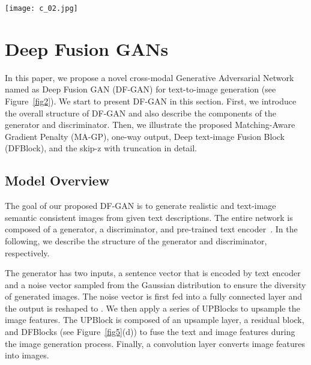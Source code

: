 \documentclass[10pt,twocolumn,letterpaper]{article}
\begin{document}
\begin{figure*}[t]
  \centering
  \texttt{[image: c\_02.jpg]}
  \caption{The architecture of the proposed DF-GAN for text-to-image synthesis. DF-GAN generates high-resolution images directly by one pair of generator and discriminator and fuses the text information and visual feature maps through multiple Deep text-image Fusion Blocks (DFBlock) in UPBlocks.  Armed with Matching-Aware Gradient Penalty (MA-GP) and one-way output, our model can synthesize more realistic and text-matching images.}
  \label{fig2}
  \vspace{-0.4cm}
\end{figure*}

\section{Deep Fusion GANs}

In this paper, we propose a novel cross-modal Generative Adversarial Network named as Deep Fusion GAN (DF-GAN) for text-to-image generation (see Figure~\ref{fig2}). 
We start to present DF-GAN in this section. First, we introduce the overall structure of DF-GAN and also describe the components of the generator and discriminator. 
Then, we illustrate the proposed Matching-Aware Gradient Penalty (MA-GP), one-way output, Deep text-image Fusion Block (DFBlock), and the skip-z with truncation in detail. 

\subsection{Model Overview}
The goal of our proposed DF-GAN is to generate realistic and text-image semantic consistent images from given text descriptions. 
The entire network is composed of a generator, a discriminator, and pre-trained text encoder~\cite{xu2018attngan}. 
In the following, we describe the structure of the generator and discriminator, respectively.

The generator has two inputs, a sentence vector that is encoded by text encoder and a noise vector sampled from the Gaussian distribution to ensure the diversity of generated images. 
The noise vector is first fed into a fully connected layer and the output is reshaped to . We then apply a series of UPBlocks to upsample the image features. The UPBlock is composed of an upsample layer, a residual block, and DFBlocks (see Figure~\ref{fig5}(d)) to fuse the text and image features during the image generation process. 
Finally, a convolution layer converts image features into images.
\end{document}
